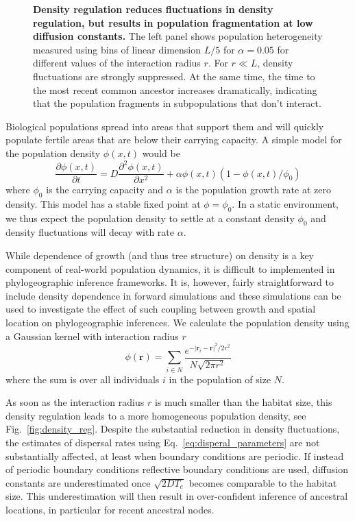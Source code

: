 \documentclass[aps,rmp, twocolumn]{revtex4}
\newcommand{\rvec}{\mathbf{r}}
\begin{document}
\begin{figure}
{    {\bf Density regulation reduces fluctuations in density regulation, but results in population fragmentation at low diffusion constants.} The left panel shows population heterogeneity measured using bins of linear dimension $L/5$ for $\alpha =0.05$ for different values of the interaction radius $r$. For $r\ll L$, density fluctuations are strongly suppressed. At the same time, the time to the most recent common ancestor increases dramatically, indicating that the population fragments in subpopulations that don't interact.}
\end{figure}

Biological populations spread into areas that support them and will quickly populate fertile areas that are below their carrying capacity.
A simple model for the population density $\phi(x,t)$ would be
\begin{equation}
    \label{eq:FKPP}
    \frac{\partial \phi(x,t)}{\partial t} = D\frac{\partial^2 \phi(x,t)}{\partial x^2} + \alpha \phi(x,t)(1-\phi(x,t)/\phi_0)
\end{equation}
where $\phi_0$ is the carrying capacity and $\alpha$ is the population growth rate at zero density.
This model has a stable fixed point at $\phi=\phi_0$.
In a static environment, we thus expect the population density to settle at a constant density $\phi_0$ and density fluctuations will decay with rate $\alpha$.

While dependence of growth (and thus tree structure) on density is a key component of real-world population dynamics, it is difficult to implemented in phylogeographic inference frameworks.
It is, however, fairly straightforward to include density dependence in forward simulations and these simulations can be used to investigate the effect of such coupling between growth and spatial location on phylogeographic inferences.
We calculate the population density using a Gaussian kernel with interaction radius $r$
\begin{equation}
    \phi(\rvec) = \sum_{i\in N} \frac{e^{-|\rvec_i - \rvec|^2/2r^2}}{N\sqrt{2\pi r^2}}
\end{equation}
where the sum is over all individuals $i$ in the population of size $N$.

As soon as the interaction radius $r$ is much smaller than the habitat size, this density regulation leads to a more homogeneous population density, see Fig.~\ref{fig:density_reg}.
Despite the substantial reduction in density fluctuations, the estimates of dispersal rates using Eq.~\ref{eq:disperal_parameters} are not substantially affected, at least when boundary conditions are periodic.
If instead of periodic boundary conditions reflective boundary conditions are used, diffusion constants are underestimated once $\sqrt{2DT_c}$ becomes comparable to the habitat size.
This underestimation will then result in over-confident inference of ancestral locations, in particular for recent ancestral nodes.
\end{document}
